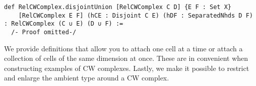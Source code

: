 \begin{lstlisting}[frame=single]
def RelCWComplex.disjointUnion [RelCWComplex C D] {E F : Set X} 
    [RelCWComplex E F] (hCE : Disjoint C E) (hDF : SeparatedNhds D F) : RelCWComplex (C ∪ E) (D ∪ F) :=
  /- Proof omitted-/
\end{lstlisting}


We provide definitions that allow you to attach one cell at a time or attach a collection of cells of the same dimension at once.
These are in convenient when constructing examples of CW complexes. 
Lastly, we make it possible to restrict and enlarge the ambient type around a CW complex.
